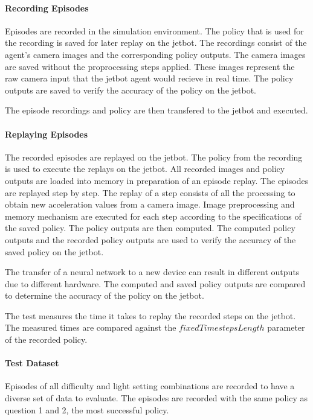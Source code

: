 \paragraph{Recording Episodes}

Episodes are recorded in the simulation environment. The policy that is used for the recording is saved for later replay on the jetbot.
The recordings consist of the agent's camera images and the corresponding policy outputs. The camera images are saved without the proprocessing steps applied. These images represent the raw camera input that the jetbot agent would recieve in real time. The policy outputs are saved to verify the accuracy of the policy on the jetbot.

The episode recordings and policy are then transfered to the jetbot and executed. 

\paragraph{Replaying Episodes}

The recorded episodes are replayed on the jetbot. The policy from the recording is used to execute the replays on the jetbot. All recorded images and policy outputs are loaded into memory in preparation of an episode replay. 
The episodes are replayed step by step. The replay of a step consists of all the processing to obtain new acceleration values from a camera image. Image preprocessing and memory mechanism are executed for each step according to the specifications of the saved policy. The policy outputs are then computed. The computed policy outputs and the recorded policy outputs are used to verify the accuracy of the saved policy on the jetbot. 

The transfer of a neural network to a new device can result in different outputs due to different hardware. The computed and saved policy outputs are compared to determine the accuracy of the policy on the jetbot.

The test measures the time it takes to replay the recorded steps on the jetbot.
The measured times are compared against the $fixedTimestepsLength$ parameter of the recorded policy.


\paragraph{Test Dataset}

Episodes of all difficulty and light setting combinations are recorded to have a diverse set of data to evaluate. The episodes are recorded with the same policy as question 1 and 2, the most successful policy.

